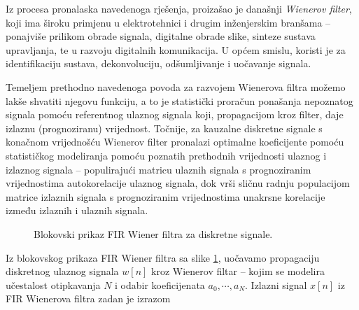 \documentclass[a4paper,12pt,oneside]{memoir}
\begin{document}
                Iz procesa pronalaska navedenoga rješenja, proizašao je današnji \textit{Wienerov filter}, koji ima široku primjenu u elektrotehnici i drugim inženjerskim branšama -- ponajviše prilikom obrade signala, digitalne obrade slike, sinteze sustava upravljanja, te u razvoju digitalnih komunikacija. U općem smislu, koristi je za identifikaciju sustava, dekonvoluciju, odšumljivanje i uočavanje signala.

                Temeljem prethodno navedenoga povoda za razvojem Wienerova filtra možemo lakše shvatiti njegovu funkciju, a to je statistički proračun ponašanja nepoznatog signala pomoću referentnog ulaznog signala koji, propagacijom kroz filter, daje izlaznu (prognoziranu) vrijednost. Točnije, za kauzalne diskretne signale s konačnom vrijednošću Wienerov filter pronalazi optimalne koeficijente pomoću statističkog modeliranja pomoću poznatih prethodnih vrijednosti ulaznog i izlaznog signala -- populirajući matricu ulaznih signala s prognoziranim vrijednostima autokorelacije ulaznog signala, dok vrši sličnu radnju populacijom matrice izlaznih signala s prognoziranim vrijednostima unakrsne korelacije između izlaznih i ulaznih signala.

                \begin{figure}[H]
                    \centering
                    \caption{Blokovski prikaz FIR Wiener filtra za diskretne signale.}
                    \label{fig:U5}
                \end{figure}
                Iz blokovskog prikaza FIR Wiener filtra sa slike \ref{fig:U5}, uočavamo propagaciju diskretnog ulaznog signala $w[n]$ kroz Wienerov filtar -- kojim se modelira učestalost otipkavanja $N$ i odabir koeficijenata ${a_0,\dotsm,a_N}$. Izlazni signal $x[n]$ iz FIR Wienerova filtra zadan je izrazom
\end{document}
